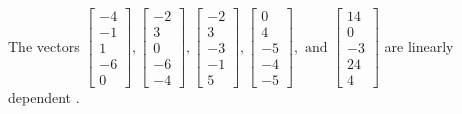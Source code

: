 \begin{exercise}
\begin{exerciseStatement}
  \end{exerciseStatement}
  \begin{exerciseAnswer}
   The vectors \(\left[\begin{array}{r}
-4 \\
-1 \\
1 \\
-6 \\
0
\end{array}\right] , \left[\begin{array}{r}
-2 \\
3 \\
0 \\
-6 \\
-4
\end{array}\right] , \left[\begin{array}{r}
-2 \\
3 \\
-3 \\
-1 \\
5
\end{array}\right] , \left[\begin{array}{r}
0 \\
4 \\
-5 \\
-4 \\
-5
\end{array}\right] , \text{ and } \left[\begin{array}{r}
14 \\
0 \\
-3 \\
24 \\
4
\end{array}\right]\) are 
  	 linearly dependent  .
  


  \end{exerciseAnswer}
\end{exercise}